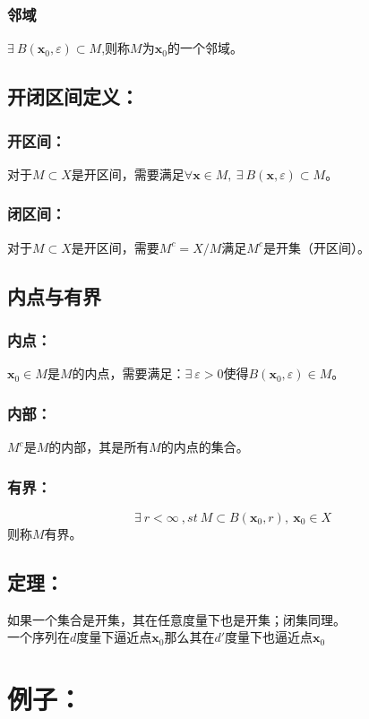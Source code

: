 \documentclass[11pt]{article}
\begin{document}
\begin{CJK*}{UTF8}{gbsn}
\subsubsection{邻域}
$\exists ~B(\bm x_0,\varepsilon )\subset M$,则称$M$为$\bm x_0$的一个邻域。
\subsection{开闭区间定义：}
\subsubsection{开区间：}
对于$M\subset X$是开区间，需要满足$\forall \bm x \in M,~\exists~ B(\bm x,\varepsilon )\subset M $。
\subsubsection{闭区间：}
对于$M\subset X$是开区间，需要$M^c=X/M$满足$M^c$是开集（开区间）。
\subsection{内点与有界}
\subsubsection{内点：}
$\bm x_0\in M$是$M$的内点，需要满足：$\exists~ \varepsilon >0 $使得$B(\bm x_0,\varepsilon )\in M$。
\subsubsection{内部：}
$M^c$是$M$的内部，其是所有$M$的内点的集合。

\subsubsection{有界：}
\begin{equation*}
	\exists~r<\infty~,st~M\subset B(\bm x_0,r),~\bm x_0\in X
\end{equation*}
则称$M$有界。

\subsection{定理：}
如果一个集合是开集，其在任意度量下也是开集；闭集同理。\\
一个序列在$d$度量下逼近点$\bm x_0$那么其在$d'$度量下也逼近点$\bm x_0$


\section{例子：}

\end{CJK*}
\end{document}
